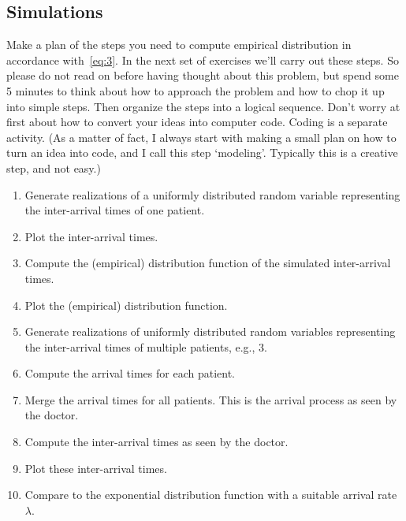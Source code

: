 

\subsection{Simulations}

\begin{exercise}
  Make a plan of the steps you need to compute empirical distribution in accordance with~\cref{eq:3}. 
  In the next set of exercises we'll carry out these steps.
  So please do not read on before having thought about this problem, but spend some 5 minutes to think about how to approach the problem and how to chop it up into simple steps.
  Then organize the steps into a logical sequence.
  Don't worry at first about how to convert your ideas into computer code.
  Coding is a separate activity.
  (As a matter of fact, I always start with making a small plan on how to turn an idea into code, and I call this step `modeling'.
  Typically this is a creative step, and not easy.)

\begin{solution}
    \begin{enumerate}
    \item Generate realizations of a uniformly distributed random variable representing the inter-arrival times of one patient.
    \item Plot the inter-arrival times.
    \item Compute the (empirical) distribution function of the simulated inter-arrival times.
    \item Plot the (empirical) distribution function.
    \item Generate realizations of uniformly distributed random variables representing the inter-arrival times of multiple patients, e.g., 3.
    \item Compute the arrival times for each patient.
    \item Merge  the arrival times for all patients. This is the arrival process as seen by the doctor.
    \item Compute the inter-arrival times as seen by the doctor.
    \item Plot these inter-arrival times.
    \item Compare to the exponential distribution function with a suitable arrival rate $\lambda$.
    \end{enumerate}
\end{solution}
\end{exercise}

